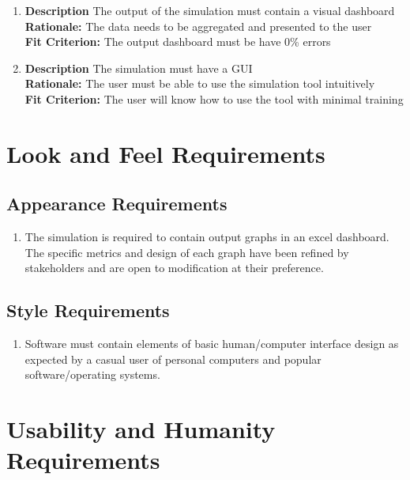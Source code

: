 \documentclass[paper=letter, fontsize=10pt]{scrartcl}
\numberwithin{equation}{section}		%
\numberwithin{figure}{section}			%
\numberwithin{table}{section}				%
\begin{document}
\begin{enumerate}
	\item \textbf{Description} The output of the simulation must contain a visual dashboard
	\\ \textbf{Rationale:} The data needs to be aggregated and presented to the user
	\\ \textbf{Fit Criterion:} The output dashboard must be have 0\% errors
	\item \textbf{Description} The simulation must have a GUI
	\\ \textbf{Rationale:} The user must be able to use the simulation tool intuitively  
	\\ \textbf{Fit Criterion:} The user will know how to use the tool with minimal training
\end{enumerate}

\section{Look and Feel Requirements}
\subsection{Appearance Requirements}
\begin{enumerate}
	\item The simulation is required to contain output graphs in an excel dashboard. The specific metrics and design of each graph have been refined by stakeholders and are open to modification at their preference.
\end{enumerate}
\subsection{Style Requirements}
\begin{enumerate}
	\item Software must contain elements of basic human/computer interface design as expected by a casual user of personal computers and popular software/operating systems.
\end{enumerate}

\section{Usability and Humanity Requirements}
\end{document}
